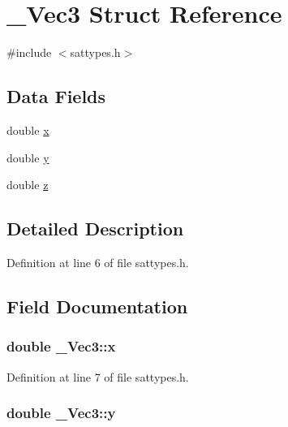 \hypertarget{struct___vec3}{\section{\-\_\-\-Vec3 Struct Reference}
\label{struct___vec3}
}


{\ttfamily \#include $<$sattypes.\-h$>$}

\subsection*{Data Fields}
\begin{DoxyCompactItemize}
\item 
double \hyperlink{struct___vec3_a89f05408b1ce51aa836cbf99bd79aaaa}{x}
\item 
double \hyperlink{struct___vec3_aadf0c086ad7cccecb4c84b540d60d490}{y}
\item 
double \hyperlink{struct___vec3_a00c51a769832f289d58ad4ec07331ab8}{z}
\end{DoxyCompactItemize}


\subsection{Detailed Description}


Definition at line 6 of file sattypes.\-h.



\subsection{Field Documentation}
\hypertarget{struct___vec3_a89f05408b1ce51aa836cbf99bd79aaaa}{
\subsubsection[{x}]{\setlength{\rightskip}{0pt plus 5cm}double \-\_\-\-Vec3\-::x}}\label{struct___vec3_a89f05408b1ce51aa836cbf99bd79aaaa}


Definition at line 7 of file sattypes.\-h.

\hypertarget{struct___vec3_aadf0c086ad7cccecb4c84b540d60d490}{
\subsubsection[{y}]{\setlength{\rightskip}{0pt plus 5cm}double \-\_\-\-Vec3\-::y}}\label{struct___vec3_aadf0c086ad7cccecb4c84b540d60d490}


